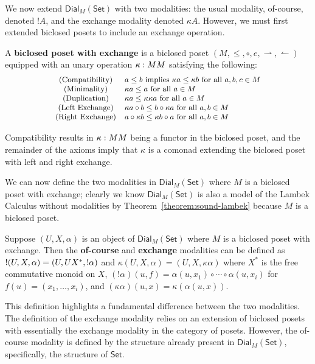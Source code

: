 \documentclass{llncs}
\let\to\relax                   %
\newcommand{\to}{\rightarrow}
\newcommand{\rto}{\leftharpoonup}
\newcommand{\lto}{\rightharpoonup}
\newcommand{\Set}{\mathsf{Set}}
\newcommand{\Dial}[2]{\mathsf{Dial}_{#1}(#2)}
\begin{document}
We now extend $\Dial{M}{\Set}$ with two modalities: the usual
modality, of-course, denoted $!A$, and the exchange modality denoted
$\kappa A$.  However, we must first extended biclosed posets to
include an exchange operation.

\begin{definition}
  \label{def:biclosed-exchange}
  A \textbf{biclosed poset with exchange} is a biclosed poset $(M,
  \leq, \circ, e, \lto, \rto)$ equipped with an unary operation
  $\kappa : M \to M$ satisfying the following:
  \[ \small
  \begin{array}{clr}
    \text{(Compatibility)} & a \leq b \text{ implies } \kappa a \leq \kappa b \text{ for all } a,b,c \in M\\
    \text{(Minimality)} & \kappa a \leq a \text{ for all } a \in M\\
    \text{(Duplication)} & \kappa a \leq \kappa\kappa a \text{ for all } a \in M\\
    \text{(Left Exchange)} & \kappa a \circ b \leq b \circ \kappa a \text{ for all } a, b \in M\\
    \text{(Right Exchange)} & a \circ \kappa b \leq \kappa b \circ a \text{ for all } a, b \in M\\
  \end{array}
  \]
\end{definition}
\noindent
Compatibility results in $\kappa : M \to M$ being a functor in the
biclosed poset, and the remainder of the axioms imply that $\kappa$ is
a comonad extending the biclosed poset with left and right exchange.

We can now define the two modalities in $\Dial{M}{\Set}$ where $M$ is
a biclosed poset with exchange; clearly we know $\Dial{M}{\Set}$ is
also a model of the Lambek Calculus without modalities by
Theorem~\ref{theorem:sound-lambek} because $M$ is a biclosed poset.
\begin{definition}
  \label{def:modalities-dial}
  Suppose $(U, X, \alpha)$ is an object of $\Dial{M}{\Set}$ where $M$
  is a biclosed poset with exchange. Then the \textbf{of-course} and
  \textbf{exchange} modalities can be defined as 
  $! (U, X, \alpha) = (U, U \to X^*, !\alpha)$ and
  $\kappa (U, X, \alpha) = (U, X, \kappa \alpha)$
  where $X^*$ is the free commutative monoid on $X$, $(!\alpha)(u, f)
  = \alpha(u, x_1) \circ \cdots \circ \alpha(u, x_i)$ for $f(u) =
  (x_1, \ldots, x_i)$, and $(\kappa \alpha)(u, x) = \kappa (\alpha(u,
  x))$.
\end{definition}
This definition highlights a fundamental difference between the two
modalities.  The definition of the exchange modality relies on an
extension of biclosed posets with essentially the exchange modality in
the category of posets.  However, the of-course modality is defined by
the structure already present in $\Dial{M}{\Set}$, specifically, the
structure of $\Set$.
\end{document}
